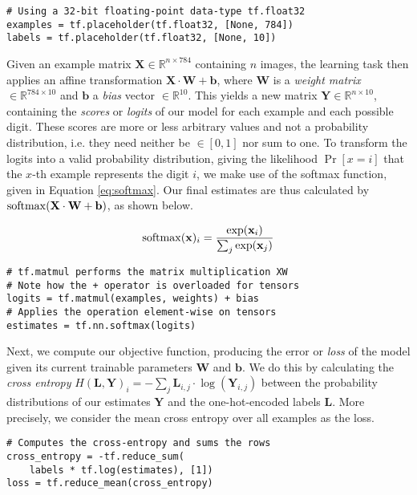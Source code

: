 \begin{lstlisting}
# Using a 32-bit floating-point data-type tf.float32
examples = tf.placeholder(tf.float32, [None, 784])
labels = tf.placeholder(tf.float32, [None, 10])
\end{lstlisting}

Given an example matrix $\mathbf{X} \in \mathbb{R}^{n \times 784}$ containing
$n$ images, the learning task then applies an affine transformation
$\mathbf{X} \cdot \mathbf{W} + \mathbf{b}$, where $\mathbf{W}$ is a \emph{weight
  matrix} $\in \mathbb{R}^{784 \times 10}$ and $\mathbf{b}$ a \emph{bias} vector
$\in \mathbb{R}^{10}$. This yields a new matrix
$\mathbf{Y} \in \mathbb{R}^{n \times 10}$, containing the \emph{scores} or
\emph{logits} of our model for each example and each possible digit. These
scores are more or less arbitrary values and not a probability distribution,
i.e. they need neither be $\in [0, 1]$ nor sum to one. To transform the logits
into a valid probability distribution, giving the likelihood $\Pr[x = i]$ that
the $x$-th example represents the digit $i$, we make use of the softmax
function, given in Equation \ref{eq:softmax}. Our final estimates are thus
calculated by $\operatorname*{softmax}(\mathbf{X} \cdot \mathbf{W} + \mathbf{b})$, as shown
below.

\begin{equation}\label{eq:softmax}
  \operatorname*{softmax}(\mathbf{x})_i = \frac{\exp(\mathbf{x}_i)}{\sum_j \exp(\mathbf{x}_j)}
\end{equation}

\begin{lstlisting}
# tf.matmul performs the matrix multiplication XW
# Note how the + operator is overloaded for tensors
logits = tf.matmul(examples, weights) + bias
# Applies the operation element-wise on tensors
estimates = tf.nn.softmax(logits)
\end{lstlisting}

Next, we compute our objective function, producing the error or \emph{loss} of
the model given its current trainable parameters $\mathbf{W}$ and
$\mathbf{b}$. We do this by calculating the \emph{cross entropy}
$H(\mathbf{L}, \mathbf{Y})_i = -\sum_j \mathbf{L}_{i,j} \cdot
\log(\mathbf{Y}_{i,j})$ between the probability distributions of our estimates
$\mathbf{Y}$ and the one-hot-encoded labels $\mathbf{L}$. More precisely, we
consider the mean cross entropy over all examples as the loss.

\begin{lstlisting}
# Computes the cross-entropy and sums the rows
cross_entropy = -tf.reduce_sum(
    labels * tf.log(estimates), [1])
loss = tf.reduce_mean(cross_entropy)
\end{lstlisting}

